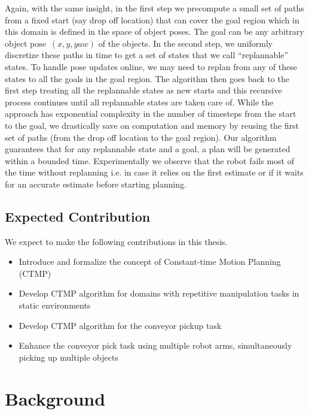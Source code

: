 \documentclass[a4paper,10pt]{article}
\begin{document}
Again, with the same insight, in the first step we precompute a small set of paths from a fixed start (say drop off location) that can cover the goal region which in this domain is defined in the space of object poses. The goal can be any arbitrary object pose~$(x,y,yaw)$ of the objects. In the second step, we uniformly discretize these paths in time to get a set of states that we call ``replannable'' states. To handle pose updates online, we may need to replan from any of these states to all the goals in the goal region. The algorithm then goes back to the first step treating all the replannable states as new starts and this recursive process continues until all replannable states are taken care of. While the approach has exponential complexity in the number of timesteps from the start to the goal, we drastically save on computation and memory by reusing the first set of paths (from the drop off location to the goal region). Our algorithm guarantees that for any replannable state and a goal, a plan will be generated within a bounded time. Experimentally we observe that the robot fails most of the time without replanning i.e. in case it relies on the first estimate or if it waits for an accurate estimate before starting planning.

\subsection{Expected Contribution}
We expect to make the following contributions in this thesis.
\begin{itemize}
	\item Introduce and formalize the concept of Constant-time Motion Planning (CTMP)
	\item Develop CTMP algorithm for domains with repetitive manipulation tasks in static environments
	\item Develop CTMP algorithm for the conveyor pickup task
	\item Enhance the conveyor pick task using multiple robot arms, simultaneously picking up multiple objects
\end{itemize}

\section{Background}
\end{document}
